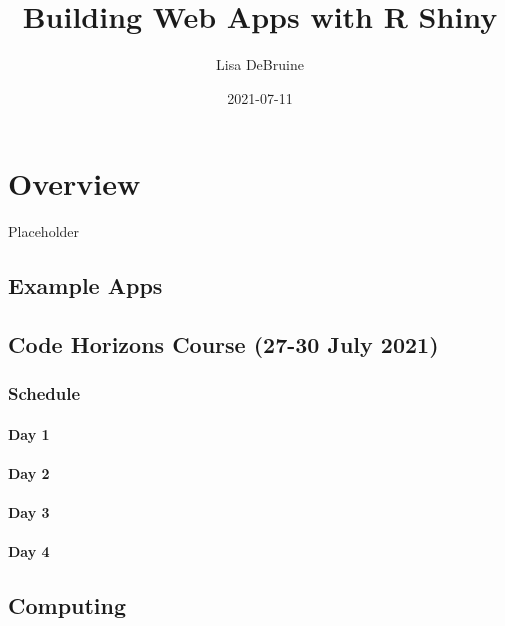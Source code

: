 \documentclass[
]{book}
\title{Building Web Apps with R Shiny}
\author{Lisa DeBruine}
\date{2021-07-11}
\begin{document}
\maketitle

{
\setcounter{tocdepth}{1}
\tableofcontents
}
\hypertarget{overview}{%
\chapter*{Overview}\label{overview}}

Placeholder

\hypertarget{example-apps}{%
\section{Example Apps}\label{example-apps}}

\hypertarget{code-horizons-course-27-30-july-2021}{%
\section{Code Horizons Course (27-30 July 2021)}\label{code-horizons-course-27-30-july-2021}}

\hypertarget{schedule}{%
\subsection{Schedule}\label{schedule}}

\hypertarget{day-1}{%
\subsubsection{Day 1}\label{day-1}}

\hypertarget{day-2}{%
\subsubsection{Day 2}\label{day-2}}

\hypertarget{day-3}{%
\subsubsection{Day 3}\label{day-3}}

\hypertarget{day-4}{%
\subsubsection{Day 4}\label{day-4}}

\hypertarget{computing}{%
\section{Computing}\label{computing}}
\end{document}
